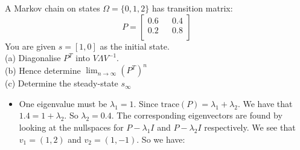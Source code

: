 \begin{example}
A Markov chain on states $\Omega = \{0,1,2\}$ has transition matrix:
$$ P = 
\begin{bmatrix} 
0.6 && 0.4 \\ 
0.2 && 0.8 \\
\end{bmatrix}
$$
You are given $s = [1,0]$ as the initial state. \\
(a) Diagonalise $P^T$ into $V\Lambda V^{-1}$. \\
(b) Hence determine $\lim_{n \rightarrow \infty} (P^T)^{n}$ \\
(c) Determine the steady-state $s_{\infty}$ \\

\begin{itemize}
\item One eigenvalue must be $\lambda_1 = 1$. Since $\text{trace}(P) = \lambda_1 + \lambda_2$. 
We have that $1.4 = 1 + \lambda_2$. So $\lambda_2 = 0.4$. 
The corresponding eigenvectors are found by looking at the nullspaces for 
$P - \lambda_1 I$ and $P - \lambda_2 I$ respectively. 
We see that $v_1 = (1,2)$ and $v_2 = (1,-1)$. So we have:


\end{itemize}
\end{example}
